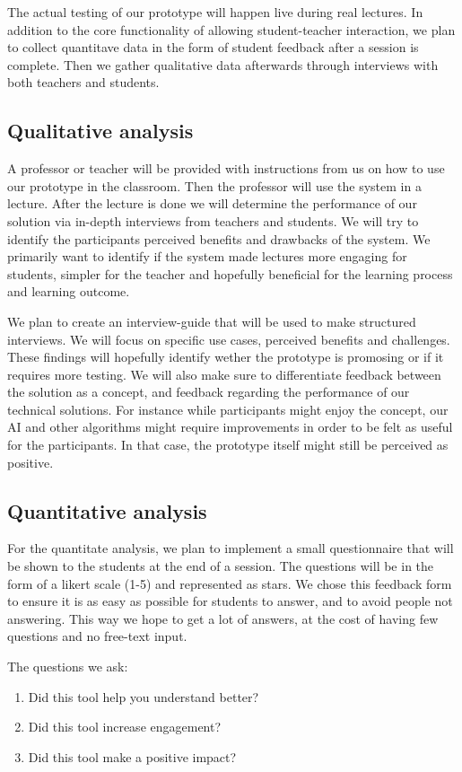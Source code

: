 The actual testing of our prototype will happen live during real lectures. In addition to the core functionality of allowing student-teacher interaction, we plan to collect quantitave data in the form of student feedback after a session is complete. Then we gather qualitative data afterwards through interviews with both teachers and students.


\subsection{Qualitative analysis}
A professor or teacher will be provided with instructions from us on how to use our prototype in the classroom. Then the professor will use the system in a lecture. After the lecture is done we will determine the performance of our solution via in-depth interviews from teachers and students. We will try to identify the participants perceived benefits and drawbacks of the system. We primarily want to identify if the system made lectures more engaging for students, simpler for the teacher and hopefully beneficial for the learning process and learning outcome.

We plan to create an interview-guide that will be used to make structured interviews. We will focus on specific use cases, perceived benefits and challenges. These findings will hopefully identify wether the prototype is promosing or if it requires more testing. We will also make sure to differentiate feedback between the solution as a concept, and feedback regarding the performance of our technical solutions. For instance while participants might enjoy the concept, our AI and other algorithms might require improvements in order to be felt as useful for the participants. In that case, the prototype itself might still be perceived as positive.


\subsection{Quantitative analysis}
For the quantitate analysis, we plan to implement a small questionnaire that will be shown to the students at the end of a session. The questions will be in the form of a likert scale (1-5) and represented as stars. We chose this feedback form to ensure it is as easy as possible for students to answer, and to avoid people not answering. This way we hope to get a lot of answers, at the cost of having few questions and no free-text input. 

The questions we ask:
\begin{enumerate}
    \item Did this tool help you understand better?
    \item Did this tool increase engagement?
    \item Did this tool make a positive impact?
\end{enumerate}

